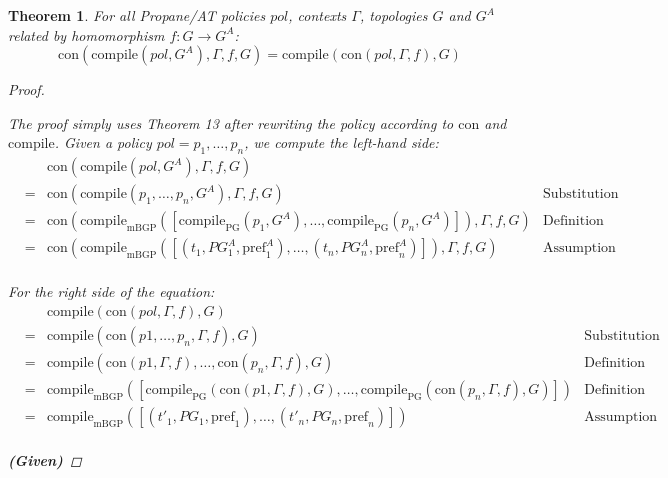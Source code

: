 \documentclass[twocolumn, openany]{sig-alternate-10pt}
\newcommand{\sysname}{{\small \sf Propane/AT}\xspace}
\newcommand{\Con}{\mathrm{con}}
\newcommand{\CompilePg}{\ensuremath{\mathrm{compile}_\mathrm{PG}}}
\newcommand{\CompileMbgp}{\ensuremath{\mathrm{compile}_\mathrm{mBGP}}}
\newcommand{\Compile}{\ensuremath{\mathrm{compile}}}
\newcommand{\Pref}{\ensuremath{\mathrm{pref}}}
\newtheorem{thm}{Theorem}
\begin{document}
\begin{thm}
  For all \sysname policies $pol$, contexts $\Gamma$, topologies $G$ and $G^A$ related by homomorphism $f : G \rightarrow G^A$:
  $$\Con(\Compile(pol,G^A),\Gamma,f,G) = \Compile(\Con(pol,\Gamma,f),G)$$

  \begin{proof} 
    $ $

    \vspace{.5em}
    \noindent
    The proof simply uses Theorem 13 after rewriting the policy according to $\Con$ and $\Compile$.
    Given a policy $pol = p_1, \ldots, p_n$, we compute the left-hand side:
    \[
    \begin{array}{llll}
      & & \Con(\Compile(pol,G^A),\Gamma,f,G) \\
      &=& \Con(\Compile(p_1, \ldots, p_n, G^A),\Gamma,f,G) & \text{Substitution} \\
      &=& \Con(\CompileMbgp([\CompilePg(p_1, G^A), \ldots, \CompilePg(p_n, G^A)]),\Gamma,f,G)
            & \text{Definition of Compile} \\
      &=& \Con(\CompileMbgp([(t_1,PG^A_1,\Pref^A_1), \ldots, (t_n,PG^A_n,\Pref^A_n)]),\Gamma,f,G)
            & \text{Assumption}\\
    \end{array}
    \]

    \vspace{.5em}
    \noindent
    For the right side of the equation:
    \[
    \begin{array}{llll}
      & & \Compile(\Con(pol,\Gamma,f),G) \\
      &=& \Compile(\Con(p1,\dots,p_n, \Gamma,f), G) 
            & \text{Substitution} \\
      &=& \Compile(\Con(p1, \Gamma, f),\dots, \Con(p_n, \Gamma,f), G) 
            & \text{Definition of con} \\
      &=& \CompileMbgp([\CompilePg(\Con(p1, \Gamma, f),G), \ldots, \CompilePg(\Con(p_n, \Gamma, f),G)]) 
            & \text{Definition of compile} \\

      &=& \CompileMbgp([(t'_1, PG_1, \Pref_1), \ldots, (t'_n, PG_n, \Pref_n)])
            & \text{Assumption} \\

    \end{array}
    \]


    \vspace{1em}
    \noindent
    \textbf{(Given)}


\end{proof}
\end{thm}
\end{document}
